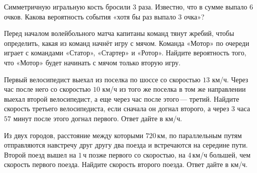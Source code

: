 \begin{class}[number=2]
\begin{listofex}
		\item Симметричную игральную кость бросили \( 3 \) раза. Известно, что в сумме выпало 6 очков. Какова вероятность события «хотя бы раз выпало \( 3 \) очка»?
		\item Перед началом волейбольного матча капитаны команд тянут жребий, чтобы определить, какая из команд начнёт игру с мячом. Команда «Мотор» по очереди играет с командами «Статор», «Стартер» и «Ротор». Найдите вероятность того, что «Мотор» будет начинать с мячом только вторую игру.
		\item Первый велосипедист выехал из поселка по шоссе со скоростью \( 13 \) км/ч. Через час после него со скоростью \( 10 \) км/ч из того же поселка в том же направлении выехал второй велосипедист, а еще через час после этого --- третий. Найдите скорость третьего велосипедиста, если сначала он догнал второго, а через \( 3 \) часа \( 57 \) минут после этого догнал первого. Ответ дайте в км/ч.
		\item Из двух городов, расстояние между которыми \( 720 \) км, по параллельным путям отправляются навстречу друг другу два поезда и встречаются на середине пути. Второй поезд вышел на \( 1 \) ч позже первого со скоростью, на \( 4 \) км/ч большей, чем скорость первого поезда. Найдите скорость второго поезда. Ответ дайте в км/ч.
	\end{listofex}
\end{class}

